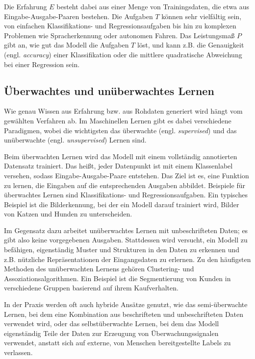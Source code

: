Die Erfahrung $E$ besteht dabei aus einer Menge von Trainingsdaten, die etwa aus Eingabe-Ausgabe-Paaren bestehen. Die Aufgaben $T$ können sehr vielfältig sein, von einfachen Klassifikations- und Regressionsaufgaben bis hin zu komplexen Problemen wie Spracherkennung oder autonomen Fahren. Das Leistungsmaß $P$ gibt an, wie gut das Modell die Aufgaben $T$ löst, und kann z.B. die Genauigkeit (engl. \textit{accuracy}) einer Klassifikation oder die mittlere quadratische Abweichung bei einer Regression sein.

\subsection{Überwachtes und unüberwachtes Lernen}

Wie genau Wissen aus Erfahrung bzw. aus Rohdaten generiert wird hängt vom gewählten Verfahren ab. Im Maschinellen Lernen gibt es dabei verschiedene Paradigmen, wobei die wichtigsten das überwachte (engl. \textit{supervised}) und das unüberwachte (engl. \textit{unsupervised}) Lernen sind.

Beim überwachten Lernen wird das Modell mit einem vollständig annotierten Datensatz trainiert. Das heißt, jeder Datenpunkt ist mit einem Klassenlabel versehen, sodass Eingabe-Ausgabe-Paare entstehen. Das Ziel ist es, eine Funktion zu lernen, die Eingaben auf die entsprechenden Ausgaben abbildet. Beispiele für überwachtes Lernen sind Klassifikations- und Regressionsaufgaben. Ein typisches Beispiel ist die Bilderkennung, bei der ein Modell darauf trainiert wird, Bilder von Katzen und Hunden zu unterscheiden. \cite{}

Im Gegensatz dazu arbeitet unüberwachtes Lernen mit unbeschrifteten Daten; es gibt also keine vorgegebenen Ausgaben. Stattdessen wird versucht, ein Modell zu befähigen, eigenständig Muster und Strukturen in den Daten zu erkennen und z.B. nützliche Repräsentationen der Eingangsdaten zu erlernen. Zu den häufigsten Methoden des unüberwachten Lernens gehören Clustering- und Assoziationsalgorithmen. Ein Beispiel ist die Segmentierung von Kunden in verschiedene Gruppen basierend auf ihrem Kaufverhalten. \cite{}

In der Praxis werden oft auch hybride Ansätze genutzt, wie das semi-überwachte Lernen, bei dem eine Kombination aus beschrifteten und unbeschrifteten Daten verwendet wird, oder das selbstüberwachte Lernen, bei dem das Modell eigenständig Teile der Daten zur Erzeugung von Überwachungssignalen verwendet, anstatt sich auf externe, von Menschen bereitgestellte Labels zu verlassen. \cite{}

